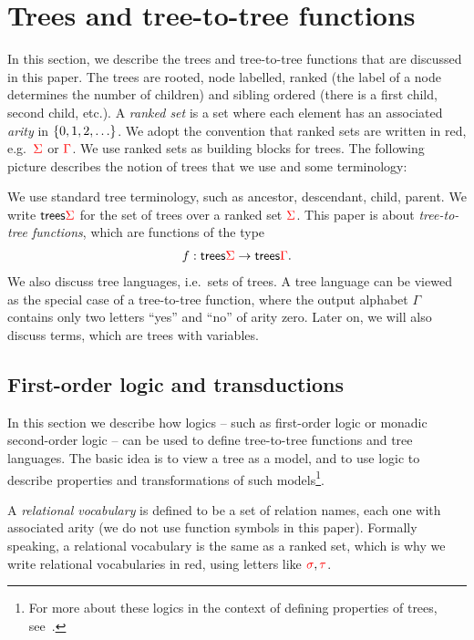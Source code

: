 \section{Trees and tree-to-tree functions}
\label{sec:trees-transductions}
 In this section, we describe the trees and tree-to-tree functions that are discussed in this paper. The  trees are rooted, node labelled, ranked (the label of a node determines the number of children) and sibling ordered (there is a first child, second child, etc.). 
A \emph{ranked set} is a set where each element has an associated \emph{arity} in $\{0,1,2,\ldots\}$. We adopt the convention that ranked sets are written in red, e.g.~${\color{red}{\Sigma}}$ or ${\color{red}{\Gamma}}$.  We use ranked sets as building blocks for trees. The following picture describes the notion of trees that we use and some terminology:

We use standard tree terminology, such as ancestor, descendant, child, parent. We write $\mathsf {trees} {\color{red}{\Sigma}}$ for the set of trees over a ranked set ${\color{red}{\Sigma}}$. This paper is about \emph{tree-to-tree functions}, which are functions of the type \begin{align*}
f : \mathsf {trees} {\color{red}{\Sigma}} \to \mathsf {trees} {\color{red}{\Gamma}}.
\end{align*}
We also discuss tree languages, i.e.~sets of trees. 
A tree language can be viewed as the special case of a tree-to-tree function, where the output alphabet $\Gamma$ contains only two letters ``yes'' and ``no'' of arity zero. Later on, we will also discuss terms, which are trees with variables. 

  
\subsection{First-order logic and transductions}
In this section we  describe how logics -- such as first-order logic or monadic second-order logic -- can be used to define tree-to-tree functions and tree languages. The basic idea is to view a tree as a model, and to use logic to describe properties and transformations of such models\footnote{For more about these logics in the context of defining properties of trees, see~\cite[Section 3]{thomas1997languages}.}. 

A \emph{relational vocabulary} is defined to be a set of relation names, each one with associated arity (we do not use function symbols in this paper). Formally speaking, a relational vocabulary is the same as a ranked set, which is why we write relational vocabularies in red, using letters like ${\color{red}{\sigma}}, {\color{red}{\tau}}$. 

